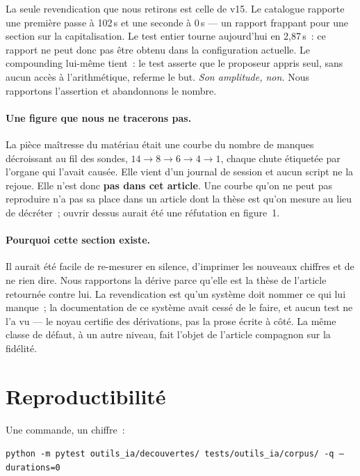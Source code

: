 \documentclass[11pt]{article}
\theoremstyle{remark}\newtheorem{remarque}{Remarque}
\begin{document}
La seule revendication que nous retirons est celle de v15. Le catalogue rapporte une
première passe à 102\,s et une seconde à 0\,s --- un rapport frappant pour une section
sur la capitalisation. Le test entier tourne aujourd'hui en 2,87\,s~: ce rapport ne peut
donc pas être obtenu dans la configuration actuelle. Le compounding lui-même tient~: le
test asserte que le proposeur appris seul, sans aucun accès à l'arithmétique, referme le
but. \emph{Son amplitude, non.} Nous rapportons l'assertion et abandonnons le nombre.

\paragraph{Une figure que nous ne tracerons pas.} La pièce maîtresse du matériau était
une courbe du nombre de manques décroissant au fil des sondes, $14 \to 8 \to 6 \to 4 \to
1$, chaque chute étiquetée par l'organe qui l'avait causée. Elle vient d'un journal de
session et aucun script ne la rejoue. Elle n'est donc \textbf{pas dans cet article}. Une
courbe qu'on ne peut pas reproduire n'a pas sa place dans un article dont la thèse est
qu'on mesure au lieu de décréter~; ouvrir dessus aurait été une réfutation en figure~1.

\paragraph{Pourquoi cette section existe.} Il aurait été facile de re-mesurer en silence,
d'imprimer les nouveaux chiffres et de ne rien dire. Nous rapportons la dérive parce
qu'elle est la thèse de l'article retournée contre lui. La revendication est qu'un
système doit nommer ce qui lui manque~; la documentation de ce système avait cessé de le
faire, et aucun test ne l'a vu --- le noyau certifie des dérivations, pas la prose écrite
à côté. La même classe de défaut, à un autre niveau, fait l'objet de l'article compagnon
sur la fidélité.

\section{Reproductibilité}
\label{sec:repro}

Une commande, un chiffre~:

\begin{center}
\texttt{python -m pytest outils\_ia/decouvertes/ tests/outils\_ia/corpus/ -q --durations=0}
\end{center}
\end{document}
